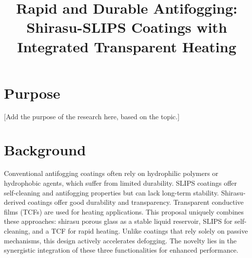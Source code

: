 \documentclass{article}
\title{Rapid and Durable Antifogging: Shirasu-SLIPS Coatings with Integrated Transparent Heating}
\author{}
\date{}
\begin{document}
\maketitle
\section{Purpose}
[Add the purpose of the research here, based on the topic.]

\section{Background}
Conventional antifogging coatings often rely on hydrophilic polymers or hydrophobic agents, which suffer from limited durability. SLIPS coatings offer self-cleaning and antifogging properties but can lack long-term stability. Shirasu-derived coatings offer good durability and transparency. Transparent conductive films (TCFs) are used for heating applications. This proposal uniquely combines these approaches: shirasu porous glass as a stable liquid reservoir, SLIPS for self-cleaning, and a TCF for rapid heating. Unlike coatings that rely solely on passive mechanisms, this design actively accelerates defogging. The novelty lies in the synergistic integration of these three functionalities for enhanced performance.
\end{document}

